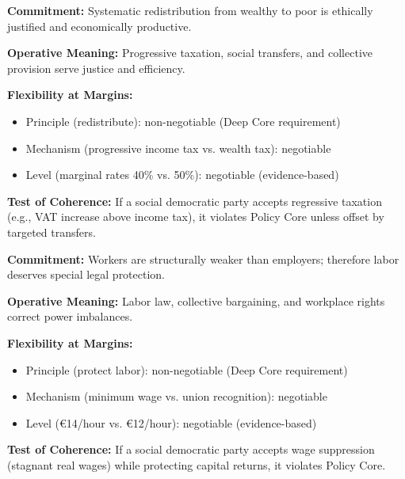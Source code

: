 \begin{tcolorbox}[colback=blue!5!white, colframe=blue!75!black,
    title=Policy Core Belief 9: Redistribution Is Legitimate]

\textbf{Commitment:} Systematic redistribution from wealthy to poor is ethically justified and economically productive.

\textbf{Operative Meaning:} Progressive taxation, social transfers, and collective provision serve justice and efficiency.

\textbf{Flexibility at Margins:}
\begin{itemize}[nosep]
\item Principle (redistribute): non-negotiable (Deep Core requirement)
\item Mechanism (progressive income tax vs. wealth tax): negotiable
\item Level (marginal rates 40\% vs. 50\%): negotiable (evidence-based)
\end{itemize}

\textbf{Test of Coherence:} If a social democratic party accepts regressive taxation (e.g., VAT increase above income tax), it violates Policy Core unless offset by targeted transfers.

\end{tcolorbox}

\begin{tcolorbox}[colback=blue!5!white, colframe=blue!75!black,
    title=Policy Core Belief 10: Labor Deserves Special Protection]

\textbf{Commitment:} Workers are structurally weaker than employers; therefore labor deserves special legal protection.

\textbf{Operative Meaning:} Labor law, collective bargaining, and workplace rights correct power imbalances.

\textbf{Flexibility at Margins:}
\begin{itemize}[nosep]
\item Principle (protect labor): non-negotiable (Deep Core requirement)
\item Mechanism (minimum wage vs. union recognition): negotiable
\item Level (€14/hour vs. €12/hour): negotiable (evidence-based)
\end{itemize}

\textbf{Test of Coherence:} If a social democratic party accepts wage suppression (stagnant real wages) while protecting capital returns, it violates Policy Core.

\end{tcolorbox}

